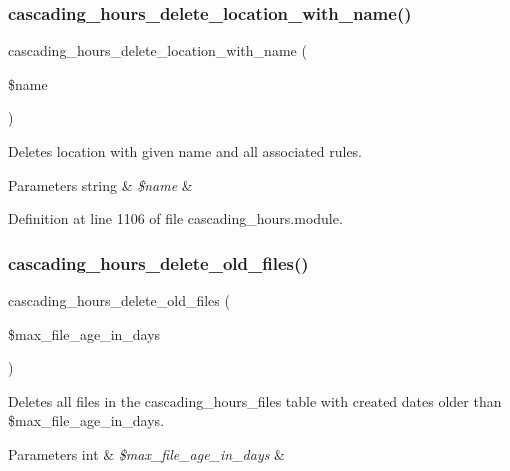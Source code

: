 \subsubsection{\texorpdfstring{cascading\+\_\+hours\+\_\+delete\+\_\+location\+\_\+with\+\_\+name()}{cascading\_hours\_delete\_location\_with\_name()}}
{\footnotesize\ttfamily cascading\+\_\+hours\+\_\+delete\+\_\+location\+\_\+with\+\_\+name (\begin{DoxyParamCaption}\item[{}]{\$name }\end{DoxyParamCaption})}



Deletes location with given name and all associated rules. 


\begin{DoxyParams}[1]{Parameters}
string & {\em \$name} & \\
\hline
\end{DoxyParams}


Definition at line 1106 of file cascading\+\_\+hours.\+module.

\mbox{\label{cascading__hours_8module_a7261bdad3d50c48e9aab304d9e669238_a7261bdad3d50c48e9aab304d9e669238}} 
\subsubsection{\texorpdfstring{cascading\+\_\+hours\+\_\+delete\+\_\+old\+\_\+files()}{cascading\_hours\_delete\_old\_files()}}
{\footnotesize\ttfamily cascading\+\_\+hours\+\_\+delete\+\_\+old\+\_\+files (\begin{DoxyParamCaption}\item[{}]{\$max\+\_\+file\+\_\+age\+\_\+in\+\_\+days }\end{DoxyParamCaption})}



Deletes all files in the cascading\+\_\+hours\+\_\+files table with created dates older than \$max\+\_\+file\+\_\+age\+\_\+in\+\_\+days. 


\begin{DoxyParams}[1]{Parameters}
int & {\em \$max\+\_\+file\+\_\+age\+\_\+in\+\_\+days} & \\
\hline
\end{DoxyParams}


